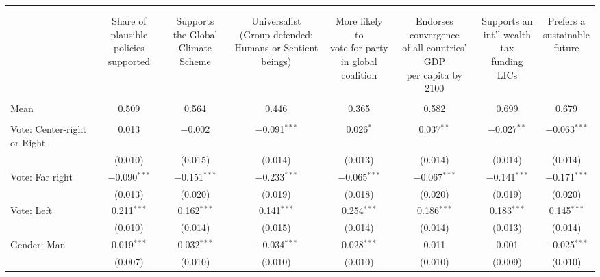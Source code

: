 
\begin{tabular}{@{\extracolsep{5pt}}lccccccc} 
\\[-1.8ex]\hline 
\hline \\[-1.8ex] 
\\[-1.8ex] & \makecell{Share of\\plausible policies\\supported} & \makecell{Supports\\the Global\\Climate Scheme} & \makecell{Universalist\\(Group defended:\\Humans or Sentient beings)} & \makecell{More likely to\\vote for party\\in global coalition} & \makecell{Endorses convergence\\of all countries' GDP\\per capita by 2100} & \makecell{Supports an\\int'l wealth tax\\funding LICs} & \makecell{Prefers a\\sustainable\\future} \\ 
\hline \\[-1.8ex] 
Mean & 0.509 & 0.564 & 0.446 & 0.365 & 0.582 & 0.699 & 0.679  \\ \hline \\[-1.8ex]
 Vote: Center\mbox{-}right or Right & 0.013 & $-$0.002 & $-$0.091$^{***}$ & 0.026$^{*}$ & 0.037$^{**}$ & $-$0.027$^{**}$ & $-$0.063$^{***}$ \\ 
  & (0.010) & (0.015) & (0.014) & (0.013) & (0.014) & (0.014) & (0.014) \\ 
  Vote: Far right & $-$0.090$^{***}$ & $-$0.151$^{***}$ & $-$0.233$^{***}$ & $-$0.065$^{***}$ & $-$0.067$^{***}$ & $-$0.141$^{***}$ & $-$0.171$^{***}$ \\ 
  & (0.013) & (0.020) & (0.019) & (0.018) & (0.020) & (0.019) & (0.020) \\ 
  Vote: Left & 0.211$^{***}$ & 0.162$^{***}$ & 0.141$^{***}$ & 0.254$^{***}$ & 0.186$^{***}$ & 0.183$^{***}$ & 0.145$^{***}$ \\ 
  & (0.010) & (0.014) & (0.015) & (0.014) & (0.014) & (0.013) & (0.014) \\ 
  Gender: Man & 0.019$^{***}$ & 0.032$^{***}$ & $-$0.034$^{***}$ & 0.028$^{***}$ & 0.011 & 0.001 & $-$0.025$^{***}$ \\ 
  & (0.007) & (0.010) & (0.010) & (0.010) & (0.010) & (0.009) & (0.010) \\ 

\end{tabular}
